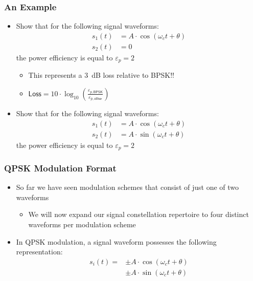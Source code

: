 \documentclass[10pt]{beamer}
\begin{document}
\frame
{
  \frametitle{An Example}

    \begin{itemize}
        \item Show that for the following signal waveforms:
        \begin{equation}
        \begin{split}
            s_1(t)&=A\cdot\cos(\omega_ct+\theta)\\
            s_2(t)&=0\nonumber
        \end{split}
        \end{equation}
        the power efficiency is equal to $\varepsilon_{p}=2$
        \begin{itemize}
            \item This represents a 3~dB loss relative to BPSK!!
            \item $\mathsf{Loss}=10\cdot\log_{10}\left(\frac{\varepsilon_{p,\mathsf{BPSK}}}{\varepsilon_{p,\mathsf{other}}}\right)$
        \end{itemize}
        \item Show that for the following signal waveforms:
        \begin{equation}
        \begin{split}
            s_1(t)&=A\cdot\cos(\omega_ct+\theta)\\
            s_2(t)&=A\cdot\sin(\omega_ct+\theta)\nonumber
        \end{split}
        \end{equation}
        the power efficiency is equal to $\varepsilon_{p}=2$
    \end{itemize}


}

\frame
{
  \frametitle{QPSK Modulation Format}

    \begin{itemize}
        \item So far we have seen modulation schemes that consist of just one of two waveforms
        \begin{itemize}
            \item We will now expand our signal constellation repertoire to four distinct waveforms per modulation scheme
        \end{itemize}
        \item In QPSK modulation, a signal waveform possesses the following representation:
        \begin{equation}
        \begin{split}
            {s_{i}(t)}=&\pm{A}\cdot\cos(\omega_{c}t+\theta)\\
            &\pm{A}\cdot\sin(\omega_{c}t+\theta)
        \end{split}
        \end{equation}
    \end{itemize}

}
\end{document}

